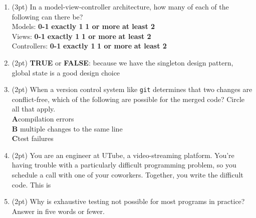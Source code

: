 \documentclass{report}
\newif\ifkey
\newcommand{\correct}[1]{\ifkey\color{red}\textbf{#1}\color{black}\else\textbf{#1}\fi\xspace}
\newcommand{\answershort}[1]{\ifkey\color{red}\underline{\textbf{#1}}\color{black}\else\underline{\hspace{3in}}\fi\xspace}
\newcommand*{\pts}[1]{\addtocounter{points}{#1}(#1pt)}
\begin{document}
\begin{spacing}{1.4}
\begin{enumerate}[leftmargin=*]
   \item \pts{3} In a model-view-controller architecture, how many of each of the following can there be?
     \\ Models: \hspace{0.75in} \textbf{0-1} \hspace{0.5in} \correct{exactly 1} \hspace{0.5in} \textbf{1 or more} \hspace{0.5in} \textbf{at least 2}
     \\ Views: \hspace{0.82in} \textbf{0-1} \hspace{0.5in} \textbf{exactly 1} \hspace{0.5in} \correct{1 or more} \hspace{0.5in} \textbf{at least 2}
     \\ Controllers: \hspace{0.51in} \textbf{0-1} \hspace{0.5in} \textbf{exactly 1} \hspace{0.5in} \correct{1 or more} \hspace{0.5in} \textbf{at least 2}

   \item \pts{2} \textbf{TRUE} or \correct{FALSE}: because we have the singleton design pattern, global state is a good design choice

   \item \pts{2} When a version control system like \lstinline{git} determines that two changes are conflict-free, which of the following
     are possible for the merged code? Circle all that apply.
     \\ \correct{A}\hspace{0.2in}compilation errors
     \\ \textbf{B}\hspace{0.2in} multiple changes to the same line
     \\ \correct{C}\hspace{0.2in}test failures

   \item \pts{2} You are an engineer at UTube, a video-streaming platform. You're having trouble with a particularly difficult
     programming problem, so you schedule a call with one of your coworkers. Together, you write the difficult code. This is
     \answershort{pair programming}

   \item \pts{2} Why is exhaustive testing not possible for most programs in practice? Answer in five words or fewer.
     \answershort{Input space is too large.}


\end{enumerate}
\end{spacing}
\end{document}
